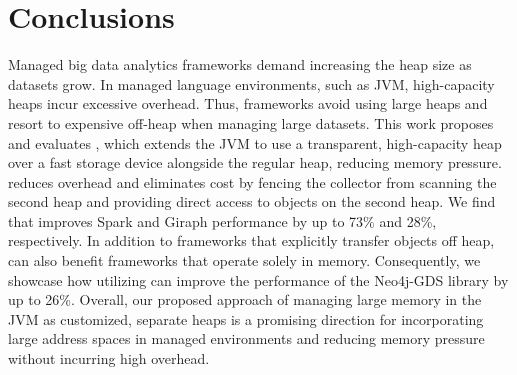 \section{Conclusions}

Managed big data analytics frameworks demand increasing the heap size as
datasets grow. In managed language environments, such as JVM, high-capacity
heaps incur excessive \teraheapGC overhead. Thus, frameworks avoid using large heaps and
resort to expensive off-heap \teraheapSD when managing large datasets. This work
proposes and evaluates \teraheapName{}, which extends the JVM to use a transparent,
high-capacity heap over a fast storage device alongside the regular heap,
reducing memory pressure. \teraheapName{} reduces \teraheapGC overhead and eliminates \teraheapSD cost
by fencing the collector from scanning the second heap and providing direct
access to objects on the second heap. We find that \teraheapName{} improves Spark
and Giraph performance by up to 73\% and 28\%, respectively. In addition to
frameworks that explicitly transfer objects off heap, \teraheapName{} can also benefit
frameworks that operate solely in memory. Consequently, we showcase how
utilizing \teraheapName{} can improve the performance of the Neo4j-GDS library by up to
26\%. Overall, our proposed approach of managing large memory in the JVM as
customized, separate heaps is a promising direction for incorporating large
address spaces in managed environments and reducing memory pressure without
incurring high \teraheapGC overhead.
